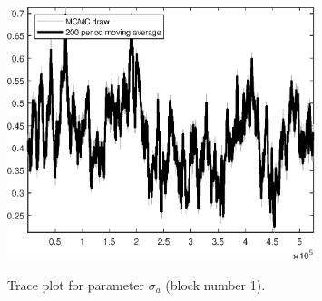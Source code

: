 \begin{figure}[H]
\centering
  \includegraphics[width=0.8\textwidth]{BRS_growth_KPR/graphs/TracePlot_sigma_a_blck_1}\\
    \caption{Trace plot for parameter ${\sigma_a}$ (block number 1).}
\end{figure}
